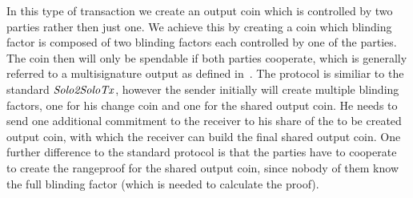 In this type of transaction we create an output coin which is controlled by two parties rather then just one. We achieve this by creating a coin which blinding factor is composed of two blinding factors each controlled
by one of the parties. The coin then will only be spendable if both parties cooperate, which is generally referred to a multisignature output as defined in~\cite{bistarelli2018analysis}. The protocol is
similiar to the standard $\mathit{Solo2SoloTx}$, however the sender initially will create multiple blinding factors, one for his change coin and one for the shared output coin. He needs to send one additional commitment to the
receiver to his share of the to be created output coin, with which the receiver can build the final shared output coin. One further difference to the standard protocol is that the parties have to cooperate to create the
rangeproof for the shared output coin, since nobody of them know the full blinding factor (which is needed to calculate the proof).

